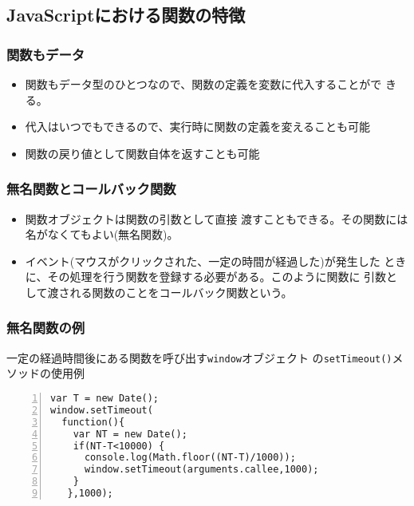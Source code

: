 \subsection{JavaScriptにおける関数の特徴}
\begin{frame}[containsverbatim]
\frametitle{関数もデータ}
\begin{itemize}
 \item 関数もデータ型のひとつなので、関数の定義を変数に代入することがで
       きる。
 \item 代入はいつでもできるので、実行時に関数の定義を変えることも可能
 \item 関数の戻り値として関数自体を返すことも可能
\end{itemize}
\end{frame}
\begin{frame}[containsverbatim]
\frametitle{無名関数とコールバック関数}
\begin{itemize}
 \item 関数オブジェクトは関数の引数として直接
渡すこともできる。その関数には名がなくてもよい(無名関数)。
 \item イベント(マウスがクリックされた、一定の時間が経過した)が発生した
       ときに、その処理を行う関数を登録する必要がある。このように関数に
       引数として渡される関数のことをコールバック関数という。
\end{itemize}
\end{frame}
\begin{frame}[containsverbatim]
\frametitle{無名関数の例}
一定の経過時間後にある関数を呼び出す\Verb+window+オブジェクト
 の\Verb+setTimeout()+メソッドの使用例

 \hspace*{1zw}\begin{minipage}[t]{0.9\textwidth}
\begin{Verbatim}[numbers=left]
var T = new Date();
window.setTimeout(
  function(){
    var NT = new Date();
    if(NT-T<10000) {
      console.log(Math.floor((NT-T)/1000));
      window.setTimeout(arguments.callee,1000);
    }
   },1000);
\end{Verbatim}
              \end{minipage}
\end{frame}
